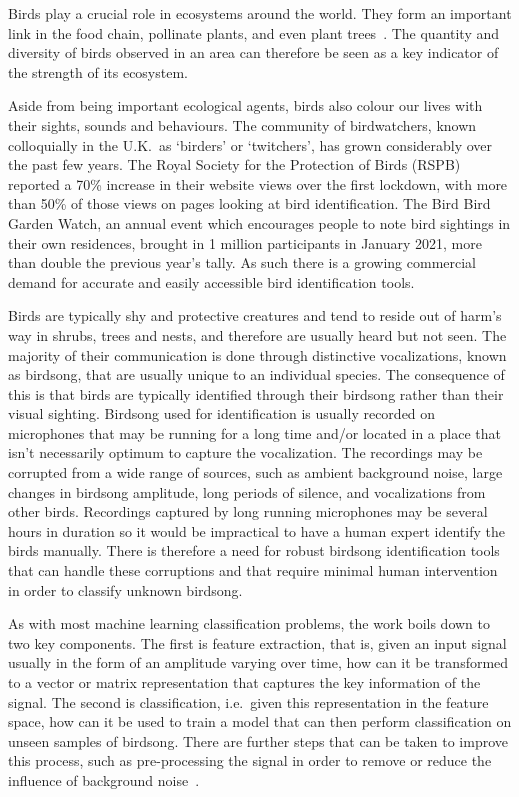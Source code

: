 Birds play a crucial role in ecosystems around the world. They form an important
link in the food chain, pollinate plants, and even plant
trees~\cite{broughton2021long}. The quantity and diversity of birds observed in
an area can therefore be seen as a key indicator of the strength of its
ecosystem.

Aside from being important ecological agents, birds also colour our lives with
their sights, sounds and behaviours. The community of birdwatchers, known
colloquially in the U.K.~as `birders' or `twitchers', has grown considerably
over the past few years. The Royal Society for the Protection of Birds (RSPB)
reported a 70\% increase in their website views over the first lockdown, with
more than 50\% of those views on pages looking at bird identification. The Bird
Bird Garden Watch, an annual event which encourages people to note bird
sightings in their own residences, brought in 1 million participants in January
2021, more than double the previous year's tally. As such there is a growing
commercial demand for accurate and easily accessible bird identification tools.

Birds are typically shy and protective creatures and tend to reside out of
harm's way in shrubs, trees and nests, and therefore are usually heard but not
seen. The majority of their communication is done through distinctive
vocalizations, known as birdsong, that are usually unique to an individual
species. The consequence of this is that birds are typically identified through
their birdsong rather than their visual sighting. Birdsong used for
identification is usually recorded on microphones that may be running for a long
time and/or located in a place that isn't necessarily optimum to capture the
vocalization. The recordings may be corrupted from a wide range of sources, such
as ambient background noise, large changes in birdsong amplitude, long periods
of silence, and vocalizations from other birds. Recordings captured by long
running microphones may be several hours in duration so it would be impractical
to have a human expert identify the birds manually. There is therefore a need
for robust birdsong identification tools that can handle these corruptions and
that require minimal human intervention in order to classify unknown birdsong.

As with most machine learning classification problems, the work boils down to
two key components. The first is feature extraction, that is, given an input
signal usually in the form of an amplitude varying over time, how can it be
transformed to a vector or matrix representation that captures the key
information of the signal. The second is classification, i.e.~given this
representation in the feature space, how can it be used to train a model that
can then perform classification on unseen samples of birdsong. There are further
steps that can be taken to improve this process, such as pre-processing the
signal in order to remove or reduce the influence of background
noise~\cite{potamitis2014automatic}.

